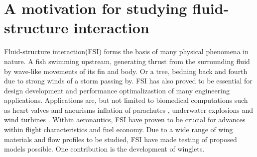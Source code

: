 \chapter{A motivation for studying fluid-structure interaction}
Fluid-structure interaction(FSI) forms the basis of many physical phenomena in nature. A fish swimming upstream,
generating thrust from the surrounding fluid by wave-like movements of its fin and body. Or a tree, bedning back and fourth due to strong winds of a storm passing by. FSI has also proved to be essential for design development and performance optimalizastion of many engineering applications. Applications are, but not limited to biomedical computations such as heart valves and aneurisms \cite{Torii2008, Vierendeels2007} inflation of parachutes \cite{Stein2001}, underwater explosions \cite{Kim2008} and wind turbines \cite{Hsu2012}. Within aeronautics, FSI have proven to be crucial for advances within flight characteristics and fuel economy. Due to a wide range of wing materials and flow profiles to be studied, FSI have made testing of proposed models possible. One contribution is the development of winglets. \\


